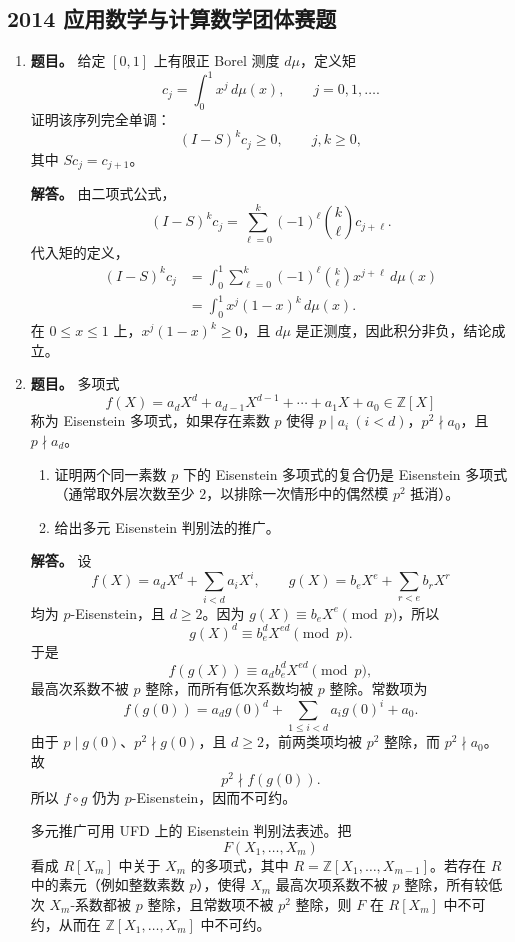﻿\documentclass[UTF8,12pt]{ctexart}
\begin{document}
\subsection{2014 应用数学与计算数学团体赛题}
\begin{enumerate}[label=\textbf{\arabic*.},leftmargin=2.2em]
\item \textbf{题目。} 给定 \([0,1]\) 上有限正 Borel 测度 \(d\mu\)，定义矩
\[
c_j=\int_0^1 x^j\,d\mu(x),\qquad j=0,1,\ldots.
\]
证明该序列完全单调：
\[
(I-S)^k c_j\ge0,\qquad j,k\ge0,
\]
其中 \(S c_j=c_{j+1}\)。

\textbf{解答。} 由二项式公式，
\[
(I-S)^k c_j
=\sum_{\ell=0}^k(-1)^\ell\binom{k}{\ell}c_{j+\ell}.
\]
代入矩的定义，
\[
\begin{aligned}
(I-S)^k c_j
&=\int_0^1
\sum_{\ell=0}^k(-1)^\ell\binom{k}{\ell}x^{j+\ell}\,d\mu(x)\\
&=\int_0^1 x^j(1-x)^k\,d\mu(x).
\end{aligned}
\]
在 \(0\le x\le1\) 上，\(x^j(1-x)^k\ge0\)，且 \(d\mu\) 是正测度，因此积分非负，结论成立。

\item \textbf{题目。} 多项式
\[
f(X)=a_dX^d+a_{d-1}X^{d-1}+\cdots+a_1X+a_0\in\mathbb Z[X]
\]
称为 Eisenstein 多项式，如果存在素数 \(p\) 使得 \(p\mid a_i\ (i<d)\)，\(p^2\nmid a_0\)，且 \(p\nmid a_d\)。
\begin{enumerate}[label=(\roman*),leftmargin=2.0em]
\item 证明两个同一素数 \(p\) 下的 Eisenstein 多项式的复合仍是 Eisenstein 多项式（通常取外层次数至少 \(2\)，以排除一次情形中的偶然模 \(p^2\) 抵消）。
\item 给出多元 Eisenstein 判别法的推广。
\end{enumerate}

\textbf{解答。} 设
\[
f(X)=a_dX^d+\sum_{i<d}a_iX^i,\qquad
g(X)=b_eX^e+\sum_{r<e}b_rX^r
\]
均为 \(p\)-Eisenstein，且 \(d\ge2\)。因为 \(g(X)\equiv b_eX^e\pmod p\)，所以
\[
g(X)^d\equiv b_e^dX^{ed}\pmod p.
\]
于是
\[
f(g(X))\equiv a_db_e^dX^{ed}\pmod p,
\]
最高次系数不被 \(p\) 整除，而所有低次系数均被 \(p\) 整除。常数项为
\[
f(g(0))=a_dg(0)^d+\sum_{1\le i<d}a_ig(0)^i+a_0.
\]
由于 \(p\mid g(0)\)、\(p^2\nmid g(0)\)，且 \(d\ge2\)，前两类项均被 \(p^2\) 整除，而 \(p^2\nmid a_0\)。故
\[
p^2\nmid f(g(0)).
\]
所以 \(f\circ g\) 仍为 \(p\)-Eisenstein，因而不可约。

多元推广可用 UFD 上的 Eisenstein 判别法表述。把
\[
F(X_1,\ldots,X_m)
\]
看成 \(R[X_m]\) 中关于 \(X_m\) 的多项式，其中 \(R=\mathbb Z[X_1,\ldots,X_{m-1}]\)。若存在 \(R\) 中的素元（例如整数素数 \(p\)），使得 \(X_m\) 最高次项系数不被 \(p\) 整除，所有较低次 \(X_m\)-系数都被 \(p\) 整除，且常数项不被 \(p^2\) 整除，则 \(F\) 在 \(R[X_m]\) 中不可约，从而在 \(\mathbb Z[X_1,\ldots,X_m]\) 中不可约。


\end{enumerate}
\end{document}
